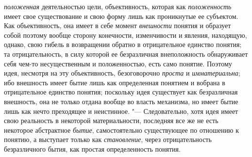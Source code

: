 {\em положенная}
деятельностью цели, объективность, которая как
{\em положенность} имеет
свое существование и свою форму лишь как проникнутые ее субъектом. Как
объективность, она имеет в себе момент
{\em внешности} понятия и
образует собой поэтому вообще сторону конечности, изменчивости и явления,
находящую, однако, свою гибель в возвращении обратно в отрицательное
единство понятия; та отрицательность, в силу которой ее безразличная
внеположность обнаруживает себя чем-то несущественным и положенностью, есть
само понятие. Поэтому идея, несмотря на эту объективность, безоговорочно
{\em проста} и
{\em имматериальна}; ибо
внешность имеет бытие лишь как определенная понятием и вобрана в
отрицательное единство понятия; поскольку идея существует как безразличная
внешность, она не только отдана вообще во власть механизма, но имеет бытие
лишь как нечто преходящее и неистинное. "--- Следовательно,
хотя идея имеет свою реальность в некоторой материальности, последняя все
же не есть некоторое абстрактное
{\em бытие},
самостоятельно существующее по отношению к понятию, а
выступает только как {\em становление},
через отрицательность безразличного бытия, как простая
определенность понятия.

